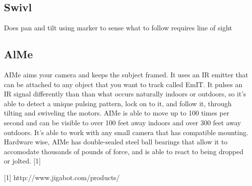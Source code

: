 \documentclass[12pt]{article}
\begin{document}
\subsection{Swivl}
Does pan and tilt using marker to sense what to follow
requires line of sight

\subsection{AlMe}
AIMe aims your camera and keeps the subject framed. It uses an IR emitter that can be attached to any object that you want to track called EmIT. It pulses an IR signal differently than than what occurs naturally indoors or outdoors, so it's able to detect a unique pulsing pattern, lock on to it, and follow it, through tilting and swiveling the motors. AIMe is able to move up to 100 times per second and can be visible to over 100 feet away indoors and over 300 feet away outdoors. It's able to work with any small camera that has compatible mounting. Hardware wise, AIMe has double-sealed steel ball bearings that allow it to accomodate thousands of pounds of force, and is able to react to being dropped or jolted. [1]

[1] http://www.jigabot.com/products/
\end{document}
